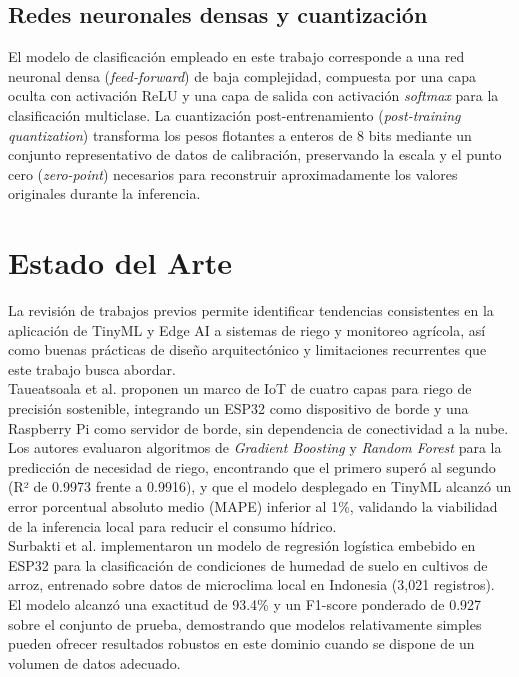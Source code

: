 \documentclass[12pt,a4paper]{article}
\begin{document}
\subsection{Redes neuronales densas y cuantización}
El modelo de clasificación empleado en este trabajo corresponde a una red neuronal densa (\textit{feed-forward}) de baja complejidad, compuesta por una capa oculta con activación ReLU y una capa de salida con activación \textit{softmax} para la clasificación multiclase. La cuantización post-entrenamiento (\textit{post-training quantization}) transforma los pesos flotantes a enteros de 8 bits mediante un conjunto representativo de datos de calibración, preservando la escala y el punto cero (\textit{zero-point}) necesarios para reconstruir aproximadamente los valores originales durante la inferencia.

\section{Estado del Arte}
\label{sec:estado_arte}

La revisión de trabajos previos permite identificar tendencias consistentes en la aplicación de TinyML y Edge AI a sistemas de riego y monitoreo agrícola, así como buenas prácticas de diseño arquitectónico y limitaciones recurrentes que este trabajo busca abordar.\\

Taueatsoala et al. \cite{taueatsoala2026} proponen un marco de IoT de cuatro capas para riego de precisión sostenible, integrando un ESP32 como dispositivo de borde y una Raspberry Pi como servidor de borde, sin dependencia de conectividad a la nube. Los autores evaluaron algoritmos de \textit{Gradient Boosting} y \textit{Random Forest} para la predicción de necesidad de riego, encontrando que el primero superó al segundo (R² de 0.9973 frente a 0.9916), y que el modelo desplegado en TinyML alcanzó un error porcentual absoluto medio (MAPE) inferior al 1\%, validando la viabilidad de la inferencia local para reducir el consumo hídrico.\\

Surbakti et al. \cite{surbakti2025} implementaron un modelo de regresión logística embebido en ESP32 para la clasificación de condiciones de humedad de suelo en cultivos de arroz, entrenado sobre datos de microclima local en Indonesia (3{,}021 registros). El modelo alcanzó una exactitud de 93.4\% y un F1-score ponderado de 0.927 sobre el conjunto de prueba, demostrando que modelos relativamente simples pueden ofrecer resultados robustos en este dominio cuando se dispone de un volumen de datos adecuado.\\
\end{document}

